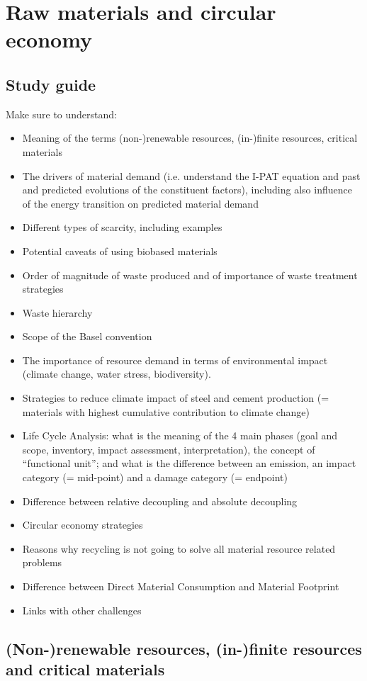 \documentclass[../summary.tex]{subfiles}
\begin{document}
	
	\section{Raw materials and circular economy}
	
	\subsection{Study guide}
	
	Make sure to understand:
	\begin{itemize}
		\item  Meaning of the terms (non-)renewable resources, (in-)finite resources, critical materials
		\item The drivers of material demand (i.e. understand the I-PAT equation and past and predicted evolutions of the constituent factors), including also influence of the energy transition on predicted material demand
		\item Different types of scarcity, including examples
		\item Potential caveats of using biobased materials
		\item Order of magnitude of waste produced and of importance of waste treatment strategies
		\item Waste hierarchy
		\item Scope of the Basel convention
		\item The importance of resource demand in terms of environmental impact (climate change, water stress, biodiversity).
		\item Strategies to reduce climate impact of steel and cement production (= materials with highest cumulative contribution to climate change)
		\item Life Cycle Analysis: what is the meaning of the 4 main phases (goal and scope, inventory, impact assessment, interpretation), the concept of “functional unit”; and what is the difference between
		an emission, an impact category (= mid-point) and a damage category (= endpoint)
		\item Difference between relative decoupling and absolute decoupling
		\item Circular economy strategies
		\item Reasons why recycling is not going to solve all material resource related problems
		\item Difference between Direct Material Consumption and Material Footprint
		\item Links with other challenges
	\end{itemize}
	
	\subsection{(Non-)renewable resources, (in-)finite resources and critical materials}
	
	
\end{document}

